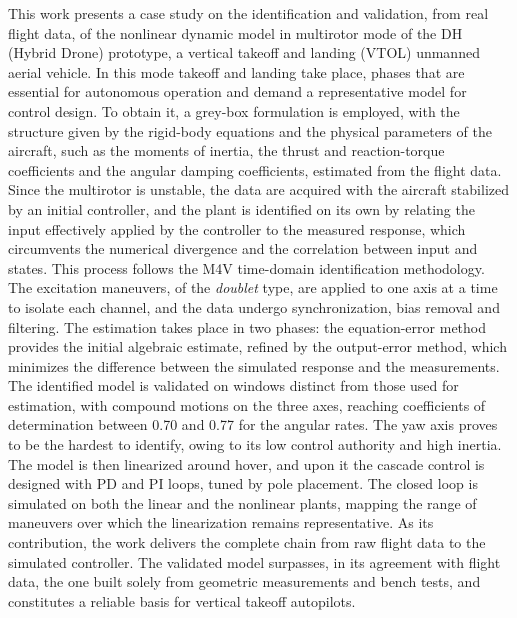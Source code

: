 This work presents a case study on the identification and validation, from real flight data, of the nonlinear dynamic model in multirotor mode of the DH (Hybrid Drone) prototype, a vertical takeoff and landing (VTOL) unmanned aerial vehicle. In this mode takeoff and landing take place, phases that are essential for autonomous operation and demand a representative model for control design. To obtain it, a grey-box formulation is employed, with the structure given by the rigid-body equations and the physical parameters of the aircraft, such as the moments of inertia, the thrust and reaction-torque coefficients and the angular damping coefficients, estimated from the flight data. Since the multirotor is unstable, the data are acquired with the aircraft stabilized by an initial controller, and the plant is identified on its own by relating the input effectively applied by the controller to the measured response, which circumvents the numerical divergence and the correlation between input and states. This process follows the M4V time-domain identification methodology. The excitation maneuvers, of the \textit{doublet} type, are applied to one axis at a time to isolate each channel, and the data undergo synchronization, bias removal and filtering. The estimation takes place in two phases: the equation-error method provides the initial algebraic estimate, refined by the output-error method, which minimizes the difference between the simulated response and the measurements. The identified model is validated on windows distinct from those used for estimation, with compound motions on the three axes, reaching coefficients of determination between 0.70 and 0.77 for the angular rates. The yaw axis proves to be the hardest to identify, owing to its low control authority and high inertia. The model is then linearized around hover, and upon it the cascade control is designed with PD and PI loops, tuned by pole placement. The closed loop is simulated on both the linear and the nonlinear plants, mapping the range of maneuvers over which the linearization remains representative. As its contribution, the work delivers the complete chain from raw flight data to the simulated controller. The validated model surpasses, in its agreement with flight data, the one built solely from geometric measurements and bench tests, and constitutes a reliable basis for vertical takeoff autopilots.

